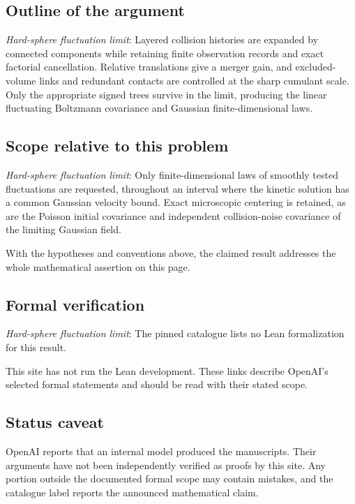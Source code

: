 \documentclass[11pt]{article}
\begin{document}
\subsection{Outline of the argument}
\textit{Hard-sphere fluctuation limit}: Layered collision histories are expanded by connected components while retaining finite observation records and exact factorial cancellation. Relative translations give a merger gain, and excluded-volume links and redundant contacts are controlled at the sharp cumulant scale. Only the appropriate signed trees survive in the limit, producing the linear fluctuating Boltzmann covariance and Gaussian finite-dimensional laws.

\subsection{Scope relative to this problem}
\textit{Hard-sphere fluctuation limit}: Only finite-dimensional laws of smoothly tested fluctuations are requested, throughout an interval where the kinetic solution has a common Gaussian velocity bound. Exact microscopic centering is retained, as are the Poisson initial covariance and independent collision-noise covariance of the limiting Gaussian field.

With the hypotheses and conventions above, the claimed result addresses the whole mathematical assertion on this page.

\subsection{Formal verification}
\textit{Hard-sphere fluctuation limit}: The pinned catalogue lists no Lean formalization for this result.

This site has not run the Lean development. These links describe OpenAI’s selected formal statements and should be read with their stated scope.

\subsection{Status caveat}
OpenAI reports that an internal model produced the manuscripts. Their arguments have not been independently verified as proofs by this site. Any portion outside the documented formal scope may contain mistakes, and the catalogue label reports the announced mathematical claim.
\end{document}
